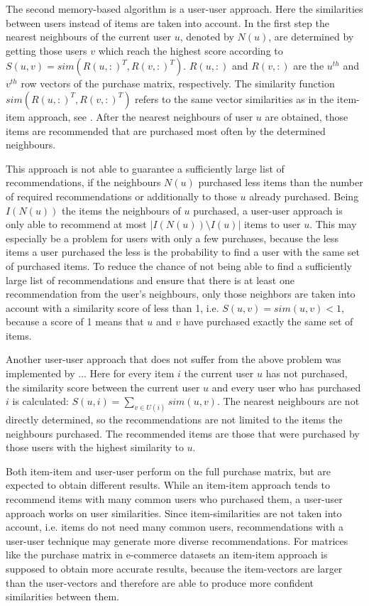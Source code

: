 \documentclass[10pt]{reportMaster}
\begin{document}
The second memory-based algorithm is a user-user approach.
Here the similarities between users instead of items are taken into account.
In the first step the nearest neighbours of the current user $u$, denoted by $N(u)$, are determined by getting those users $v$ which reach the highest score according to $S(u,v) = sim(R(u,:)^T, R(v, :)^T)$.
$R(u,:)$ and $R(v,:)$ are the $u^{th}$ and $v^{th}$ row vectors of the purchase matrix, respectively.
The similarity function $sim(R(u,:)^T, R(v, :)^T)$ refers to the same vector similarities as in the item-item approach, see . %
After the nearest neighbours of user $u$ are obtained, those items are recommended that are purchased most often by the determined neighbours. %

This approach is not able to guarantee a sufficiently large list of recommendations, if the neighbours $N(u)$ purchased less items than the number of required recommendations or additionally to those $u$ already purchased.
Being $I(N(u))$ the items the neighbours of $u$ purchased, a user-user approach is only able to recommend at most $|I(N(u)) \setminus I(u)|$ items to user $u$.
This may especially be a problem for users with only a few purchases, because the less items a user purchased the less is the probability to find a user with the same set of purchased items.
To reduce the chance of not being able to find a sufficiently large list of recommendations and ensure that there is at least one recommendation from the user's neighbours, only those neighbors are taken into account with a similarity score of less than 1, i.e. $S(u,v) = sim(u, v) < 1$, because a score of 1 means that $u$ and $v$ have purchased exactly the same set of items.

Another user-user approach that does not suffer from the above problem was implemented by ... %
Here for every item $i$ the current user $u$ has not purchased, the similarity score between the current user $u$ and every user who has purchased $i$ is calculated: $S(u,i) = \sum_{v \in U(i)}{sim(u,v)}$.
The nearest neighbours are not directly determined, so the recommendations are not limited to the items the neighbours purchased.
The recommended items are those that were purchased by those users with the highest similarity to $u$.

Both item-item and user-user perform on the full purchase matrix, but are expected to obtain different results.
While an item-item approach tends to recommend items with many common users who purchased them, a user-user approach works on user similarities.
Since item-similarities are not taken into account, i.e. items do not need many common users, recommendations with a user-user technique may generate more diverse recommendations.
For matrices like the purchase matrix in e-commerce datasets an item-item approach is supposed to obtain more accurate results, because the item-vectors are larger than the user-vectors and therefore are able to produce more confident similarities between them. 
\end{document}
